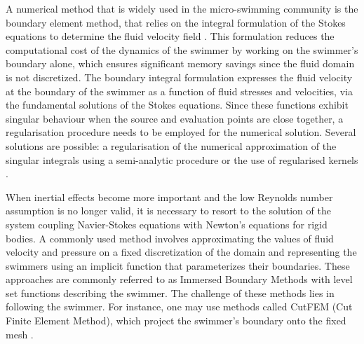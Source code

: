 \documentclass[graybox]{svmult}
\newcommand{\review}[1]{\textcolor{blue}{#1}}
\begin{document}
A numerical method that is widely used in the micro-swimming community is the boundary element method, that relies on the integral formulation of the Stokes equations to determine the fluid velocity field \cite{pozrikidis_boundary_1992}. 
This formulation reduces the computational cost of the dynamics of the swimmer by working on the swimmer's boundary alone, which ensures significant memory savings since the fluid domain is not discretized. 
The boundary integral formulation expresses the fluid velocity at the boundary of the swimmer as a function of fluid stresses and velocities, via the fundamental solutions of the Stokes equations. Since these functions exhibit singular behaviour when the source and evaluation points are close together, a regularisation procedure needs to be employed for the numerical solution. Several solutions are possible: a regularisation of the numerical approximation of the singular integrals using a semi-analytic procedure \cite{huang_notes_1993} or the use of regularised kernels \cite{olson_coupling_2011}. 




When inertial effects become more important and the low Reynolds number assumption is no longer valid, 
it is necessary to resort to the solution of the system coupling Navier-Stokes equations with Newton's equations for rigid bodies. 
A commonly used method involves approximating the values of fluid velocity and pressure on a fixed discretization of the domain and representing the swimmers using an implicit function that parameterizes their boundaries. 
These approaches are commonly referred to as Immersed Boundary Methods with level set functions describing the swimmer. 
The challenge of these methods lies in following the swimmer. 
For instance, one may use methods called CutFEM (Cut Finite Element Method), which project the swimmer's boundary onto the fixed mesh \cite{monasse_conservative_2012,bergmann_accurate_2014,bergmann_bioinspired_2016,hansbo_cut_2016,burman_cutfem_2015}.





\end{document}

